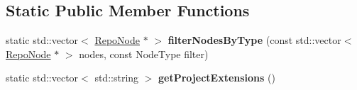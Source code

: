 \subsection*{Static Public Member Functions}
\begin{DoxyCompactItemize}
\item 
\hypertarget{classrepo_1_1core_1_1model_1_1_repo_scene_a6dd9444bcaf520efbfe085d0193eeab9}{}static std\+::vector$<$ \hyperlink{classrepo_1_1core_1_1model_1_1_repo_node}{Repo\+Node} $\ast$ $>$ {\bfseries filter\+Nodes\+By\+Type} (const std\+::vector$<$ \hyperlink{classrepo_1_1core_1_1model_1_1_repo_node}{Repo\+Node} $\ast$ $>$ nodes, const Node\+Type filter)\label{classrepo_1_1core_1_1model_1_1_repo_scene_a6dd9444bcaf520efbfe085d0193eeab9}

\item 
\hypertarget{classrepo_1_1core_1_1model_1_1_repo_scene_a7207ff3cea12594804131bfc74fa1e01}{}static std\+::vector$<$ std\+::string $>$ {\bfseries get\+Project\+Extensions} ()\label{classrepo_1_1core_1_1model_1_1_repo_scene_a7207ff3cea12594804131bfc74fa1e01}

\end{DoxyCompactItemize}
